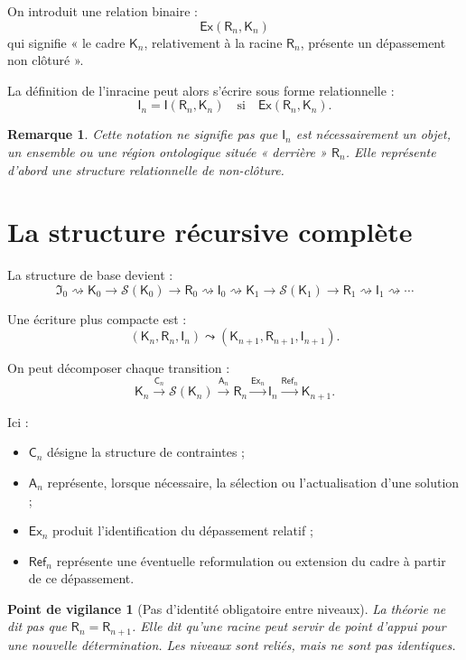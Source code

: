 \documentclass[11pt,a4paper]{article}
\newtheorem{remark}{Remarque}[section]
\newtheorem{warning}{Point de vigilance}[section]
\newcommand{\Rac}{\mathsf{R}}
\newcommand{\Inrac}{\mathsf{I}}
\newcommand{\Cadre}{\mathsf{K}}
\newcommand{\Con}{\mathsf{C}}
\newcommand{\Sol}{\mathcal{S}}
\newcommand{\Actual}{\mathsf{A}}
\newcommand{\Ex}{\mathsf{Ex}}
\newcommand{\Refi}{\mathsf{Ref}}
\newcommand{\nextlev}{\leadsto}
\begin{document}
On introduit une relation binaire :
\[
\Ex(\Rac_n,\Cadre_n)
\]
qui signifie « le cadre \(\Cadre_n\), relativement à la racine \(\Rac_n\),
présente un dépassement non clôturé ».

La définition de l'inracine peut alors s'écrire sous forme relationnelle :
\[
\boxed{
\Inrac_n=\Inrac(\Rac_n,\Cadre_n)
\quad\text{si}\quad
\Ex(\Rac_n,\Cadre_n).
}
\]

\begin{remark}
Cette notation ne signifie pas que \(\Inrac_n\) est nécessairement un objet,
un ensemble ou une région ontologique située « derrière » \(\Rac_n\). Elle
représente d'abord une structure relationnelle de non-clôture.
\end{remark}

\section{La structure récursive complète}

La structure de base devient :
\[
\boxed{
\mathfrak I_0
\rightsquigarrow
\Cadre_0
\to
\Sol(\Cadre_0)
\to
\Rac_0
\rightsquigarrow
\Inrac_0
\rightsquigarrow
\Cadre_1
\to
\Sol(\Cadre_1)
\to
\Rac_1
\rightsquigarrow
\Inrac_1
\rightsquigarrow\cdots
}
\]

Une écriture plus compacte est :
\[
\boxed{
(\Cadre_n,\Rac_n,\Inrac_n)
\nextlev
(\Cadre_{n+1},\Rac_{n+1},\Inrac_{n+1}).
}
\]

On peut décomposer chaque transition :
\[
\Cadre_n
\overset{\Con_n}{\longrightarrow}
\Sol(\Cadre_n)
\overset{\Actual_n}{\longrightarrow}
\Rac_n
\overset{\Ex_n}{\longrightarrow}
\Inrac_n
\overset{\Refi_n}{\longrightarrow}
\Cadre_{n+1}.
\]

Ici :
\begin{itemize}
    \item \(\Con_n\) désigne la structure de contraintes ;
    \item \(\Actual_n\) représente, lorsque nécessaire, la sélection ou
    l'actualisation d'une solution ;
    \item \(\Ex_n\) produit l'identification du dépassement relatif ;
    \item \(\Refi_n\) représente une éventuelle reformulation ou extension du
    cadre à partir de ce dépassement.
\end{itemize}

\begin{warning}[Pas d'identité obligatoire entre niveaux]
La théorie ne dit pas que \(\Rac_n=\Rac_{n+1}\). Elle dit qu'une racine peut
servir de point d'appui pour une nouvelle détermination. Les niveaux sont
reliés, mais ne sont pas identiques.
\end{warning}
\end{document}

